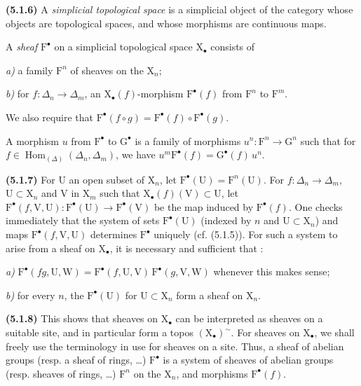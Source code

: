 \documentclass[11pt,leqno]{article}
\begin{document}
\textbf{(5.1.6)} A \textit{simplicial topological space} is a simplicial object of the category whose objects are topological spaces, and whose morphisms are continuous maps.

A \textit{sheaf} \(\mathrm{F}^{\bullet}\) on a simplicial topological space \(\mathrm{X}_{\bullet}\) consists of

\noindent\textit{a)} a family \(\mathrm{F}^n\) of sheaves on the \(\mathrm{X}_n\);\par
\noindent\textit{b)} for \(f:\Delta_n\to\Delta_m\), an \(\mathrm{X}_{\bullet}(f)\)-morphism \(\mathrm{F}^{\bullet}(f)\) from \(\mathrm{F}^n\) to \(\mathrm{F}^m\).\par

We also require that \(\mathrm{F}^{\bullet}(f\circ g)=\mathrm{F}^{\bullet}(f)\circ\mathrm{F}^{\bullet}(g)\).

A morphism \(u\) from \(\mathrm{F}^{\bullet}\) to \(\mathrm{G}^{\bullet}\) is a family of morphisms \(u^n:\mathrm{F}^n\to\mathrm{G}^n\) such that for \(f\in\operatorname{Hom}_{(\Delta)}(\Delta_n,\Delta_m)\), we have \(u^m\mathrm{F}^{\bullet}(f)=\mathrm{G}^{\bullet}(f)\,u^n\).

\textbf{(5.1.7)} For \(\mathrm{U}\) an open subset of \(\mathrm{X}_n\), let \(\mathrm{F}^{\bullet}(\mathrm{U})=\mathrm{F}^n(\mathrm{U})\). For \(f:\Delta_n\to\Delta_m\), \(\mathrm{U}\subset\mathrm{X}_n\) and \(\mathrm{V}\) in \(\mathrm{X}_m\) such that \(\mathrm{X}_{\bullet}(f)(\mathrm{V})\subset\mathrm{U}\), let \(\mathrm{F}^{\bullet}(f,\mathrm{V},\mathrm{U}):\mathrm{F}^{\bullet}(\mathrm{U})\to\mathrm{F}^{\bullet}(\mathrm{V})\) be the map induced by \(\mathrm{F}^{\bullet}(f)\). One checks immediately that the system of sets \(\mathrm{F}^{\bullet}(\mathrm{U})\) (indexed by \(n\) and \(\mathrm{U}\subset\mathrm{X}_n\)) and maps \(\mathrm{F}^{\bullet}(f,\mathrm{V},\mathrm{U})\) determines \(\mathrm{F}^{\bullet}\) uniquely (cf. (5.1.5)). For such a system to arise from a sheaf on \(\mathrm{X}_{\bullet}\), it is necessary and sufficient that :

\noindent\textit{a)} \(\mathrm{F}^{\bullet}(fg,\mathrm{U},\mathrm{W})=\mathrm{F}^{\bullet}(f,\mathrm{U},\mathrm{V})\,\mathrm{F}^{\bullet}(g,\mathrm{V},\mathrm{W})\) whenever this makes sense;\par
\noindent\textit{b)} for every \(n\), the \(\mathrm{F}^{\bullet}(\mathrm{U})\) for \(\mathrm{U}\subset\mathrm{X}_n\) form a sheaf on \(\mathrm{X}_n\).\par

\textbf{(5.1.8)} This shows that sheaves on \(\mathrm{X}_{\bullet}\) can be interpreted as sheaves on a suitable site, and in particular form a topos \((\mathrm{X}_{\bullet})^{\sim}\). For sheaves on \(\mathrm{X}_{\bullet}\), we shall freely use the terminology in use for sheaves on a site. Thus, a sheaf of abelian groups (resp. a sheaf of rings, …) \(\mathrm{F}^{\bullet}\) is a system of sheaves of abelian groups (resp. sheaves of rings, …) \(\mathrm{F}^n\) on the \(\mathrm{X}_n\), and morphisms \(\mathrm{F}^{\bullet}(f)\).
\end{document}
